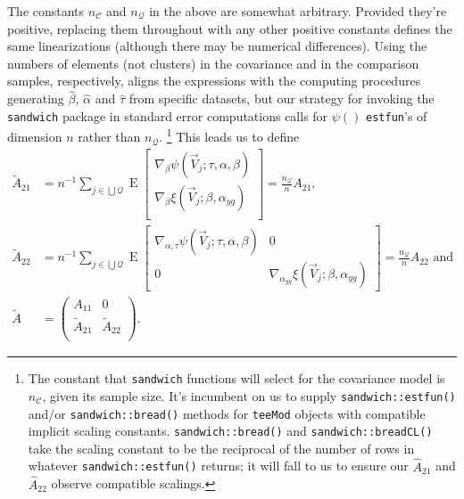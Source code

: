 \documentclass{article}
\newcommand{\EE}{\operatorname{E}}
\begin{document}
The constants $n_{\mathcal{C}}$ and
$n_{\mathcal{Q}}$ in the above are somewhat
arbitrary.  Provided they're positive, replacing them throughout with any other
positive constants defines the same linearizations (although there may
be numerical differences).
Using the numbers of elements (not
clusters) in the covariance and in the comparison samples,
respectively, aligns the expressions with the computing procedures
generating $\hat\beta$, $\hat{\alpha}$ and $\hat\tau$ from specific
datasets, but our strategy for invoking the \texttt{sandwich} package
in standard error computations calls for  $\psi()$ \texttt{estfun}'s
of dimension $n$ rather than $n_{\mathcal{Q}}$.%
\footnote{%
  The constant that \texttt{sandwich}
  functions will select for the covariance model is $n_{\mathcal{C}}$, given its sample
  size.  It's incumbent on us to supply \texttt{sandwich::estfun()}
  and/or \texttt{sandwich::bread()} methods for
  \texttt{teeMod} objects with compatible implicit scaling
  constants. \texttt{sandwich::bread()} and
  \texttt{sandwich::breadCL()} take the scaling constant to be the
  reciprocal of the number of rows in whatever
  \texttt{sandwich::estfun()} returns; it will fall to us to ensure
  our $\hat{A}_{21}$ and $\hat{A}_{22}$ observe compatible scalings.}%
 This leads us to define
\begin{align}\label{eq:29}
  \tilde{A}_{21} &= n^{-1} \sum_{j\in \bigcup
        \mathcal{Q}}\EE\begin{bmatrix} \nabla_{\beta}\psi(\vec{V}_{j};
          \tau, \alpha, \beta )\\
          \nabla_{\beta}\xi(\vec{V}_{j}; \beta, \alpha_{yg})\\ \end{bmatrix}
                          = \frac{n_{\mathcal{Q}}}{n} {A}_{21},\\
  \tilde{A}_{22} &= n^{-1} \sum_{j\in \bigcup
        \mathcal{Q}}\EE\begin{bmatrix} \nabla_{\alpha, \tau}\psi(\vec{V}_{j};
          \tau, \alpha, \beta ) & 0 \\
        0 & \nabla_{\alpha_{yg}}\xi(\vec{V}_{j}; \beta, \alpha_{yg})\end{bmatrix} = \frac{n_{\mathcal{Q}}}{n}
                                 {A}_{22} \text{ and}\nonumber\\
  \tilde{A} &= \left(
              \begin{array}{cc}
                A_{11} & 0 \\
                \tilde{A}_{21} & \tilde{A}_{22}\\
              \end{array}
\right).\nonumber
\end{align}
\end{document}
